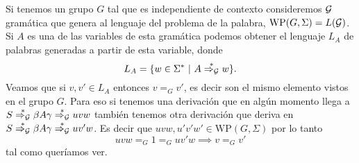 \documentclass[tesis.tex]{subfiles}
\newcommand{\WP}{\text{WP}(G, \Sigma)}
\newcommand{\deriva}{\overset{*}{\Rightarrow_{\cal G}}}
\begin{document}
\begin{obs}\label{palabras-wp}
Si tenemos un grupo $G$ tal que es independiente de contexto consideremos $\cal G$ gramática que genera al lenguaje del problema de la palabra, $\WP = L(\cal G)$.
Si $A$ es una de las variables de esta gramática podemos obtener el lenguaje $L_A$ de palabras generadas a partir de esta variable, donde
\[
L_A = \{ w \in \Sigma^*  \ | \ A \deriva w  \}.
\]
Veamos que si $v,v' \in L_A$ entonces $v =_G v'$, es decir son el mismo elemento vistos en el grupo $G$. 
Para eso si tenemos una derivación que en algún momento llega a $S \deriva \beta A \gamma \deriva uvw$ también tenemos otra derivación que deriva en $S \deriva \beta A \gamma  \deriva uv'w$. 
Es decir que $uvw, u'v'w' \in \WP$ por lo tanto 
\begin{equation*}
	uvw =_G 1 =_G uv'w \implies v =_G v'
\end{equation*}
tal como queríamos ver.
\end{obs}
\end{document}
